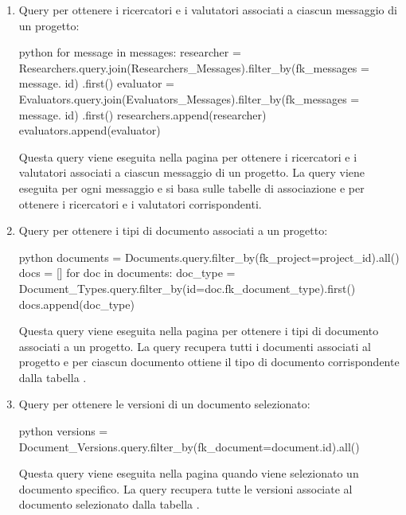 \documentclass{report}
\begin{document}
\begin{enumerate}
\item Query per ottenere i ricercatori e i valutatori associati a ciascun messaggio di un progetto:\\
\begin{minipage}{\linewidth}
\begin{imtaCode}{python}
for message in messages:
    researcher = Researchers.query.join(Researchers_Messages).filter_by(fk_messages = message. id) .first()
    evaluator = Evaluators.query.join(Evaluators_Messages).filter_by(fk_messages = message. id) .first()
    researchers.append(researcher)
    evaluators.append(evaluator)
             \end{imtaCode}
\end{minipage}
Questa query viene eseguita nella pagina   per ottenere i ricercatori e i valutatori associati a ciascun messaggio di un progetto. La query viene eseguita per ogni messaggio e si basa sulle tabelle di associazione   e   per ottenere i ricercatori e i valutatori corrispondenti.

\item Query per ottenere i tipi di documento associati a un progetto:\\
\begin{minipage}{\linewidth}
\begin{imtaCode}{python}
documents = Documents.query.filter_by(fk_project=project_id).all()
docs = []
for doc in documents:
    doc_type = Document_Types.query.filter_by(id=doc.fk_document_type).first()
    docs.append(doc_type)
             \end{imtaCode}
\end{minipage}
Questa query viene eseguita nella pagina   per ottenere i tipi di documento associati a un progetto. La query recupera tutti i documenti associati al progetto e per ciascun documento ottiene il tipo di documento corrispondente dalla tabella  .

\item Query per ottenere le versioni di un documento selezionato: \\
\begin{minipage}{\linewidth}
\begin{imtaCode}{python}
versions = Document_Versions.query.filter_by(fk_document=document.id).all()
         \end{imtaCode}
\end{minipage}
Questa query viene eseguita nella pagina   quando viene selezionato un documento specifico. La query recupera tutte le versioni associate al documento selezionato dalla tabella  .


\end{enumerate}
\end{document}

